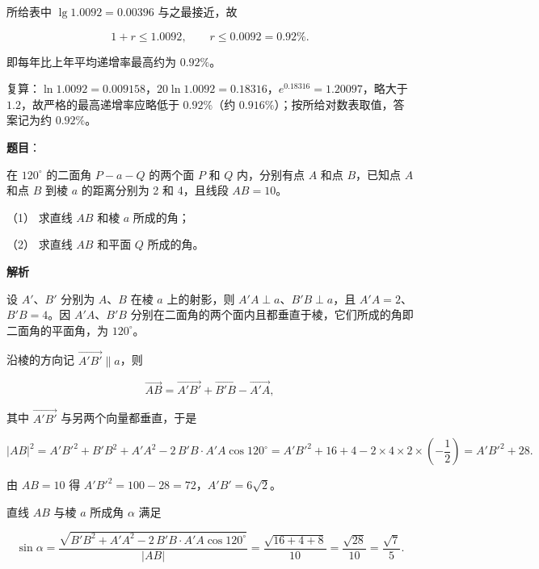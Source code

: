 \begin{answer}
所给表中 $\lg1.0092=0.00396$ 与之最接近，故

\nopagebreak[4]
\[
1+r\leqslant1.0092,\qquad r\leqslant0.0092=0.92\%.
\]

即每年比上年平均递增率最高约为 $0.92\%$。

复算：$\ln1.0092=0.009158$，$20\ln1.0092=0.18316$，$e^{0.18316}=1.20097$，略大于 $1.2$，故严格的最高递增率应略低于 $0.92\%$（约 $0.916\%$）；按所给对数表取值，答案记为约 $0.92\%$。



\end{answer}
\begin{answer}

\textbf{题目}：

在 $120^\circ$ 的二面角 $P-a-Q$ 的两个面 $P$ 和 $Q$ 内，分别有点 $A$ 和点 $B$，已知点 $A$ 和点 $B$ 到棱 $a$ 的距离分别为 2 和 4，且线段 $AB=10$。

（1） 求直线 $AB$ 和棱 $a$ 所成的角；

（2） 求直线 $AB$ 和平面 $Q$ 所成的角。

\textbf{解析}

设 $A'$、$B'$ 分别为 $A$、$B$ 在棱 $a$ 上的射影，则 $A'A\perp a$、$B'B\perp a$，且 $A'A=2$、$B'B=4$。因 $A'A$、$B'B$ 分别在二面角的两个面内且都垂直于棱，它们所成的角即二面角的平面角，为 $120^\circ$。

沿棱的方向记 $\overrightarrow{A'B'}\parallel a$，则

\nopagebreak[4]
\[
\overrightarrow{AB}=\overrightarrow{A'B'}+\overrightarrow{B'B}-\overrightarrow{A'A},
\]

其中 $\overrightarrow{A'B'}$ 与另两个向量都垂直，于是

\nopagebreak[4]
\[
\lvert AB\rvert^2=A'B'^2+B'B^2+A'A^2-2\,B'B\cdot A'A\cos120^\circ
=A'B'^2+16+4-2\times4\times2\times\left(-\frac12\right)=A'B'^2+28.
\]

由 $AB=10$ 得 $A'B'^2=100-28=72$，$A'B'=6\sqrt2$。


直线 $AB$ 与棱 $a$ 所成角 $\alpha$ 满足

\nopagebreak[4]
\[
\sin\alpha=\frac{\sqrt{B'B^2+A'A^2-2\,B'B\cdot A'A\cos120^\circ}}{\lvert AB\rvert}
=\frac{\sqrt{16+4+8}}{10}=\frac{\sqrt{28}}{10}=\frac{\sqrt7}{5}.
\]


\end{answer}
